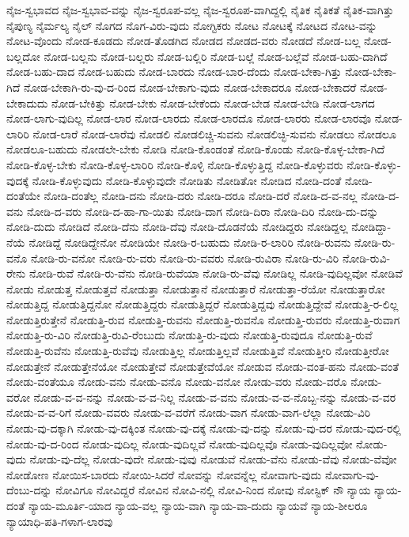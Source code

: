 {ನೈಜ-ಸ್ವಭಾವದ
ನೈಜ-ಸ್ವಭಾವ-ವನ್ನು
ನೈಜ-ಸ್ವರೂಪ-ವಲ್ಲ
ನೈಜ-ಸ್ವರೂಪ-ವಾಗಿದ್ದಲ್ಲಿ
ನೈತಿಕ
ನೈತಿಕತೆ
ನೈತಿಕ-ವಾಗಿತ್ತು
ನೈಪುಣ್ಯ
ನೈರ್ಮಲ್ಯ
ನೈಲ್
ನೊಗದ
ನೊಗ-ವಿರು-ವುದು
ನೋಗ್ಟಿಕರು
ನೋಟ
ನೋಟಕ್ಕೆ
ನೋಟದ
ನೋಟ-ವನ್ನು
ನೋಟ-ವೊಂದು
ನೋಡ-ಕೂಡದು
ನೋಡ-ತೊಡಗಿದ
ನೋಡದ
ನೋಡದ-ವರು
ನೋಡದೆ
ನೋಡ-ಬಲ್ಲ
ನೋಡ-ಬಲ್ಲದೋ
ನೋಡ-ಬಲ್ಲನು
ನೋಡ-ಬಲ್ಲರು
ನೋಡ-ಬಲ್ಲಿರಿ
ನೋಡ-ಬಲ್ಲೆ
ನೋಡ-ಬಲ್ಲೆವೆ
ನೋಡ-ಬಹು-ದಾಗಿದೆ
ನೋಡ-ಬಹು-ದಾದ
ನೋಡ-ಬಹುದು
ನೋಡ-ಬಾರದು
ನೋಡ-ಬಾರ-ದೆಂದು
ನೋಡ-ಬೇಕಾ-ಗಿತ್ತು
ನೋಡ-ಬೇಕಾ-ಗಿದೆ
ನೋಡ-ಬೇಕಾಗಿ-ರು-ವು-ದ-ರಿಂದ
ನೋಡ-ಬೇಕಾಗು-ವುದು
ನೋಡ-ಬೇಕಾದರೂ
ನೋಡ-ಬೇಕಾದರೆ
ನೋಡ-ಬೇಕಾದುದು
ನೋಡ-ಬೇಕಿತ್ತು
ನೋಡ-ಬೇಕು
ನೋಡ-ಬೇಕೆಂದು
ನೋಡ-ಬೇಡ
ನೋಡ-ಬೇಡಿ
ನೋಡ-ಲಾಗದ
ನೋಡ-ಲಾಗು-ವುದಿಲ್ಲ
ನೋಡ-ಲಾರ
ನೋಡ-ಲಾರದು
ನೋಡ-ಲಾರದೊ
ನೋಡ-ಲಾರರು
ನೋಡ-ಲಾರವೊ
ನೋಡ-ಲಾರಿರಿ
ನೋಡ-ಲಾರೆ
ನೋಡ-ಲಾರೆವು
ನೋಡಲಿ
ನೋಡಲಿಚ್ಚಿ-ಸುವನು
ನೋಡಲಿಚ್ಛಿ-ಸುವನು
ನೋಡಲು
ನೋಡಲೂ
ನೋಡಲೂ-ಬಹುದು
ನೋಡಲೇ-ಬೇಕು
ನೋಡಿ
ನೋಡಿ-ಕೊಂಡಂತೆ
ನೋಡಿ-ಕೊಂಡು
ನೋಡಿ-ಕೊಳ್ಳ-ಬೇಕಾ-ಗಿದೆ
ನೋಡಿ-ಕೊಳ್ಳ-ಬೇಕು
ನೋಡಿ-ಕೊಳ್ಳ-ಲಾರಿರಿ
ನೋಡಿ-ಕೊಳ್ಳಿ
ನೋಡಿ-ಕೊಳ್ಳುತ್ತಿದ್ದ
ನೋಡಿ-ಕೊಳ್ಳುವರು
ನೋಡಿ-ಕೊಳ್ಳು-ವುದಕ್ಕೆ
ನೋಡಿ-ಕೊಳ್ಳುವುದು
ನೋಡಿ-ಕೊಳ್ಳುವುದೇ
ನೋಡಿತು
ನೋಡಿತೋ
ನೋಡಿದ
ನೋಡಿ-ದಂತೆ
ನೋಡಿ-ದಂತೆಯೇ
ನೋಡಿ-ದಂತೆಲ್ಲ
ನೋಡಿ-ದನು
ನೋಡಿ-ದರು
ನೋಡಿ-ದರೂ
ನೋಡಿ-ದರೆ
ನೋಡಿ-ದ-ವ-ನಲ್ಲ
ನೋಡಿ-ದ-ವನು
ನೋಡಿ-ದ-ವರು
ನೋಡಿ-ದ-ಹಾ-ಗಾ-ಯಿತು
ನೋಡಿ-ದಾಗ
ನೋಡಿ-ದಿರಾ
ನೋಡಿ-ದಿರಿ
ನೋಡಿ-ದು-ದನ್ನು
ನೋಡಿ-ದುದು
ನೋಡಿದೆ
ನೋಡಿ-ದೆನು
ನೋಡಿ-ದೆವು
ನೋಡಿ-ದೊಡನೆಯೆ
ನೋಡಿದ್ದರು
ನೋಡಿದ್ದಲ್ಲ
ನೋಡಿದ್ದಾ-ನೆಯೆ
ನೋಡಿದ್ದೆ
ನೋಡಿದ್ದೇನೋ
ನೋಡಿಯೇ
ನೋಡಿ-ರ-ಬಹುದು
ನೋಡಿ-ರ-ಲಾರಿರಿ
ನೋಡಿ-ರುವನು
ನೋಡಿ-ರು-ವನೊ
ನೋಡಿ-ರು-ವನೋ
ನೋಡಿ-ರು-ವರು
ನೋಡಿ-ರು-ವವರು
ನೋಡಿ-ರುವಿರಾ
ನೋಡಿ-ರು-ವಿರಿ
ನೋಡಿ-ರುವಿ-ರೇನು
ನೋಡಿ-ರುವೆ
ನೋಡಿ-ರು-ವೆನು
ನೋಡಿ-ರುವೆಯಾ
ನೋಡಿ-ರು-ವೆವು
ನೋಡಿಲ್ಲ
ನೋಡಿ-ವುದಿಲ್ಲವೋ
ನೋಡಿವೆ
ನೋಡು
ನೋಡುತ್ತ
ನೋಡುತ್ತವೆ
ನೋಡುತ್ತಾ
ನೋಡುತ್ತಾನೆ
ನೋಡುತ್ತಾರೆ
ನೋಡುತ್ತಾ-ರೆಯೋ
ನೋಡುತ್ತಾರೋ
ನೋಡುತ್ತಿದ್ದ
ನೋಡುತ್ತಿದ್ದನೋ
ನೋಡುತ್ತಿದ್ದರು
ನೋಡುತ್ತಿದ್ದರೆ
ನೋಡುತ್ತಿದ್ದವು
ನೋಡುತ್ತಿದ್ದೇವೆ
ನೋಡುತ್ತಿ-ರ-ಲಿಲ್ಲ
ನೋಡುತ್ತಿರುತ್ತೇನೆ
ನೋಡುತ್ತಿ-ರುವ
ನೋಡುತ್ತಿ-ರುವನು
ನೋಡುತ್ತಿ-ರುವನೊ
ನೋಡುತ್ತಿ-ರುವರು
ನೋಡುತ್ತಿ-ರುವಾಗ
ನೋಡುತ್ತಿ-ರು-ವಿರಿ
ನೋಡುತ್ತಿ-ರುವಿ-ರೆಂಬುದು
ನೋಡುತ್ತಿ-ರು-ವುದು
ನೋಡುತ್ತಿ-ರುವುದೂ
ನೋಡುತ್ತಿ-ರುವೆ
ನೋಡುತ್ತಿ-ರುವೆನು
ನೋಡುತ್ತಿ-ರುವೆವು
ನೋಡುತ್ತಿಲ್ಲ
ನೋಡುತ್ತಿಲ್ಲವೆ
ನೋಡುತ್ತಿವೆ
ನೋಡುತ್ತೀರಿ
ನೋಡುತ್ತೀರೋ
ನೋಡುತ್ತೇನೆ
ನೋಡುತ್ತೇನೆಯೋ
ನೋಡುತ್ತೇವೆ
ನೋಡುತ್ತೇವೆಯೋ
ನೋಡುವ
ನೋಡು-ವಂತ-ಹನು
ನೋಡು-ವಂತೆ
ನೋಡು-ವಂತೆಯೂ
ನೋಡು-ವನು
ನೋಡು-ವನೊ
ನೋಡು-ವನೋ
ನೋಡು-ವರು
ನೋಡು-ವರೊ
ನೋಡು-ವರೋ
ನೋಡು-ವ-ವ-ನನ್ನು
ನೋಡು-ವ-ವ-ನಿಲ್ಲ
ನೋಡು-ವ-ವನು
ನೋಡು-ವ-ವ-ನೊಬ್ಬ-ನನ್ನು
ನೋಡು-ವ-ವರ
ನೋಡು-ವ-ವ-ರಿಗೆ
ನೋಡು-ವವರು
ನೋಡು-ವ-ವರೆಗೆ
ನೋಡು-ವಾಗ
ನೋಡು-ವಾಗ-ಲೆಲ್ಲಾ
ನೋಡು-ವಿರಿ
ನೋಡು-ವು-ದಕ್ಕಾಗಿ
ನೋಡು-ವು-ದಕ್ಕಿಂತ
ನೋಡು-ವು-ದಕ್ಕೆ
ನೋಡು-ವು-ದನ್ನು
ನೋಡು-ವು-ದರ
ನೋಡು-ವುದ-ರಲ್ಲಿ
ನೋಡು-ವು-ದ-ರಿಂದ
ನೋಡು-ವುದಿಲ್ಲ
ನೋಡು-ವುದಿಲ್ಲವೆ
ನೋಡು-ವುದಿಲ್ಲವೊ
ನೋಡು-ವುದಿಲ್ಲವೋ
ನೋಡು-ವುದು
ನೋಡು-ವು-ದೆಲ್ಲ
ನೋಡು-ವುದೇ
ನೋಡು-ವುವು
ನೋಡುವೆ
ನೋಡು-ವೆನು
ನೋಡು-ವೆವು
ನೋಡು-ವೆವೋ
ನೋಡೋಣ
ನೋಯಿಸ-ಬಾರದು
ನೋಯಿ-ಸಿದರೆ
ನೋವನ್ನು
ನೋವನ್ನೆಲ್ಲ
ನೋವಾಗು-ವುದು
ನೋವಾಗು-ವು-ದೆಂಬು-ದನ್ನು
ನೋವಿಗೂ
ನೋವಿದ್ದರೆ
ನೋವಿನ
ನೋವಿ-ನಲ್ಲಿ
ನೋವಿ-ನಿಂದ
ನೋವು
ನೋಸ್ಟಿಕ್
ನೌ
ನ್ಯಾಯ
ನ್ಯಾಯ-ದಂತೆ
ನ್ಯಾಯ-ಮೂರ್ತಿ-ಯಾದ
ನ್ಯಾಯ-ವಲ್ಲ
ನ್ಯಾಯ-ವಾಗಿ
ನ್ಯಾಯ-ವಾ-ದುದು
ನ್ಯಾಯವೆ
ನ್ಯಾಯ-ಶೀಲರೂ
ನ್ಯಾಯಾಧಿ-ಪತಿ-ಗಳಾಗ-ಲಾರವು
}
